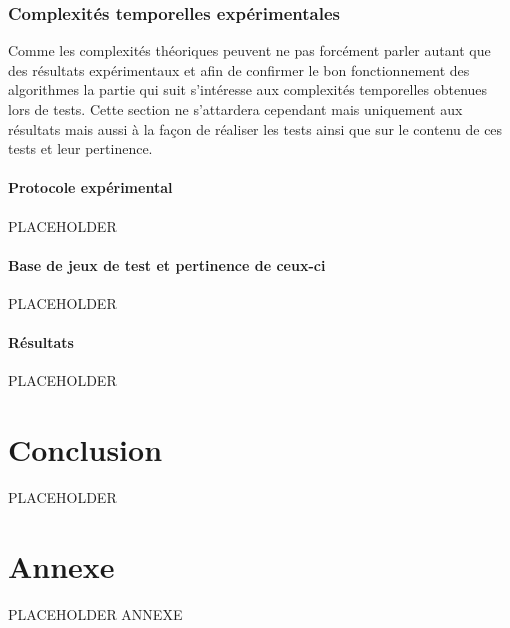 \documentclass{article}
\begin{document}
        \subsubsection{Complexités temporelles expérimentales}
        
        Comme les complexités théoriques peuvent ne pas forcément parler autant que des résultats expérimentaux et afin de confirmer le bon fonctionnement des algorithmes la partie qui suit s'intéresse aux complexités temporelles obtenues lors de tests. Cette section ne s'attardera cependant mais uniquement aux résultats mais aussi à la façon de réaliser les tests ainsi que sur le contenu de ces tests et leur pertinence.
        
            \paragraph{Protocole expérimental}
            
            PLACEHOLDER
        
            \paragraph{Base de jeux de test et pertinence de ceux-ci}
            
            PLACEHOLDER
            
            \paragraph{Résultats}
            
            PLACEHOLDER

\section{Conclusion}

PLACEHOLDER

\newpage
\appendix

\section*{Annexe}

PLACEHOLDER ANNEXE

\newpage
\tableofcontents
\end{document}
